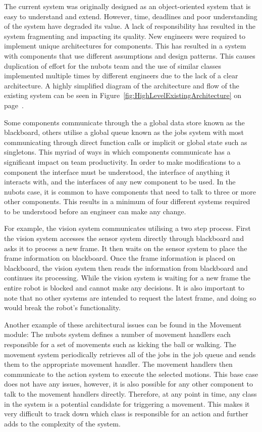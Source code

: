 \documentclass[english,12pt]{scrartcl}
\begin{document}
			The current system was originally designed as an object-oriented system that is easy to understand and extend.
			However, time, deadlines and poor understanding of the system have degraded its value.
			A lack of responsibility has resulted in the system fragmenting and impacting its quality.
			New engineers were required to implement unique architectures for components.
			This has resulted in a system with components that use different assumptions and design patterns.
			This causes duplication of effort for the \gls{nubots} team and the use of similar classes implemented multiple times by different engineers due to the lack of a clear architecture.
			A highly simplified diagram of the architecture and flow of the existing system can be seen in Figure~\ref{fig:HighLevelExistingArchitecture} on page~\pageref{fig:HighLevelExistingArchitecture}.

			Some components communicate through the a global data store known as the blackboard, others utilise a global queue known as the jobs system with most communicating through direct function calls or implicit or global state such as singletons.
			This myriad of ways in which components communicate has a significant impact on team productivity.
			In order to make modifications to a component the interface must be understood, the interface of anything it interacts with, and the interfaces of any new component to be used.
			In the \gls{nubots} case, it is common to have components that need to talk to three or more other components. This results in a minimum of four different systems required to be understood before an engineer can make any change.

			For example, the vision system communicates utilising a two step process.
			First the vision system accesses the sensor system directly through blackboard and asks it to process a new frame.
			It then waits on the sensor system to place the frame information on blackboard. Once the frame information is placed on blackboard, the vision system then reads the information from blackboard and continues its processing.
			While the vision system is waiting for a new frame the entire robot is blocked and cannot make any decisions.
			It is also important to note that no other systems are intended to request the latest frame, and doing so would break the robot’s functionality.

			Another example of these architectural issues can be found in the Movement module:
			The \gls{nubots} system defines a number of movement handlers each responsible for a set of movements such as kicking the ball or walking.
			The movement system periodically retrieves all of the jobs in the job queue and sends them to the appropriate movement handler.
			The movement handlers then communicate to the action system to execute the selected motions.
			This base case does not have any issues, however, it is also possible for any other component to talk to the movement handlers directly.
			Therefore, at any point in time, any class in the system is a potential candidate for triggering a movement.
			This makes it very difficult to track down which class is responsible for an action and further adds to the complexity of the system.
\end{document}
